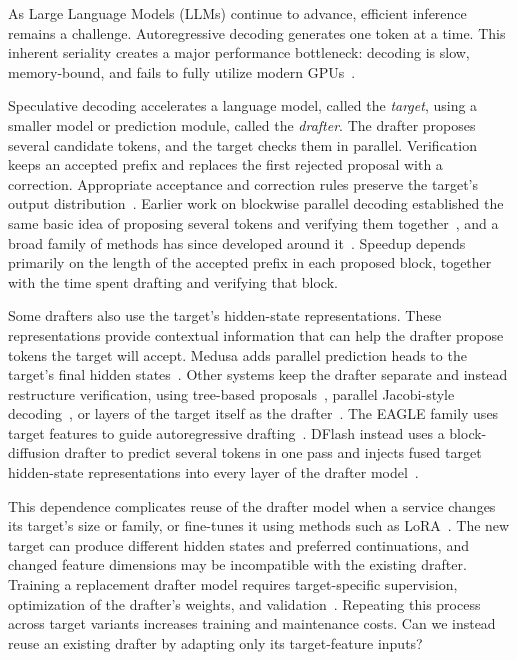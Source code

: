 As Large Language Models (LLMs) continue to advance, efficient inference remains a challenge. Autoregressive decoding generates one token at a time. This inherent seriality creates a major performance bottleneck: decoding is slow, memory-bound, and fails to fully utilize modern GPUs~\citep{cai2024medusa,vaswani2017attention}.

Speculative decoding accelerates a language model, called the \emph{target}, using a smaller model or prediction module, called the \emph{drafter}. The drafter proposes several candidate tokens, and the target checks them in parallel. Verification keeps an accepted prefix and replaces the first rejected proposal with a correction. Appropriate acceptance and correction rules preserve the target's output distribution~\citep{leviathan2023speculative,chen2023sampling}. Earlier work on blockwise parallel decoding established the same basic idea of proposing several tokens and verifying them together~\citep{stern2018blockwise}, and a broad family of methods has since developed around it~\citep{xia2024survey}. Speedup depends primarily on the length of the accepted prefix in each proposed block, together with the time spent drafting and verifying that block.

Some drafters also use the target's hidden-state representations. These representations provide contextual information that can help the drafter propose tokens the target will accept. Medusa adds parallel prediction heads to the target's final hidden states~\citep{cai2024medusa}. Other systems keep the drafter separate and instead restructure verification, using tree-based proposals~\citep{miao2024specinfer,chen2024sequoia}, parallel Jacobi-style decoding~\citep{fu2024lookahead}, or layers of the target itself as the drafter~\citep{zhang2024draftverify,elhoushi2024layerskip}. The EAGLE family uses target features to guide autoregressive drafting~\citep{li2024eagle,li2024eagle2,li2025eagle3}. DFlash instead uses a block-diffusion drafter to predict several tokens in one pass and injects fused target hidden-state representations into every layer of the drafter model~\citep{chen2026dflash}.

This dependence complicates reuse of the drafter model when a service changes its target's size or family, or fine-tunes it using methods such as LoRA~\citep{hu2022lora}. The new target can produce different hidden states and preferred continuations, and changed feature dimensions may be incompatible with the existing drafter. Training a replacement drafter model requires target-specific supervision, optimization of the drafter's weights, and validation~\citep{li2025eagle3,chen2026dflash}. Repeating this process across target variants increases training and maintenance costs. Can we instead reuse an existing drafter by adapting only its target-feature inputs?

